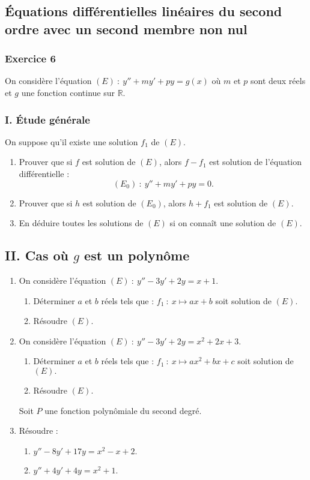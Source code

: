 \documentclass[12pt]{article}
\begin{document}
\subsection*{Équations différentielles linéaires du second ordre avec un second membre non nul}
\subsubsection*{Exercice 6}
On considère l'équation \((E)\ :\ y''+m y'+p y =g(x)\) où \(m\) et \(p\) sont deux réels et \(g\) une fonction continue sur \(\mathbb{R}\).

\subsubsection*{I. Étude générale}
On suppose qu'il existe une solution \(f_{1}\) de \((E)\).
\begin{enumerate}
    \item Prouver que si \(f\) est solution de \((E)\), alors \(f-f_{1}\) est solution de l'équation différentielle :
    \[(E_{0})\ :\ y''+m y'+p y=0.\]
    \item Prouver que si \(h\) est solution de \((E_{0})\), alors \(h+f_{1}\) est solution de \((E)\).
    \item En déduire toutes les solutions de \((E)\) si on connaît une solution de \((E)\).
\end{enumerate}
\subsection*{II. Cas où \(g\) est un polynôme}
\begin{enumerate}
    \item On considère l'équation \((E)\ :\ y''-3y'+2y=x+1.\)
    \begin{enumerate}
        \item Déterminer \(a\) et \(b\) réels tels que :
        \(f_{1}\ :\ x\mapsto ax+b\) soit solution de \((E).\) 
        \item Résoudre \((E).\) 
    \end{enumerate}
    \item On considère l'équation \((E)\ :\ y''-3y'+2y=x^{2}+2x+3.\)
    \begin{enumerate}
        \item Déterminer \(a\) et \(b\) réels tels que :
        \(f_{1}\ :\ x\mapsto ax^{2}+bx+c\) soit solution de \((E).\) 
        \item Résoudre \((E).\) 
    \end{enumerate}
    Soit \(P\) une fonction polynômiale du second degré.
    \item Résoudre :
    \begin{enumerate}
        \item \(y''-8y'+17y=x^{2}-x+2.\)
        \item \(y''+4y'+4y=x^{2}+1.\)
    \end{enumerate}
\end{enumerate}
\end{document}
